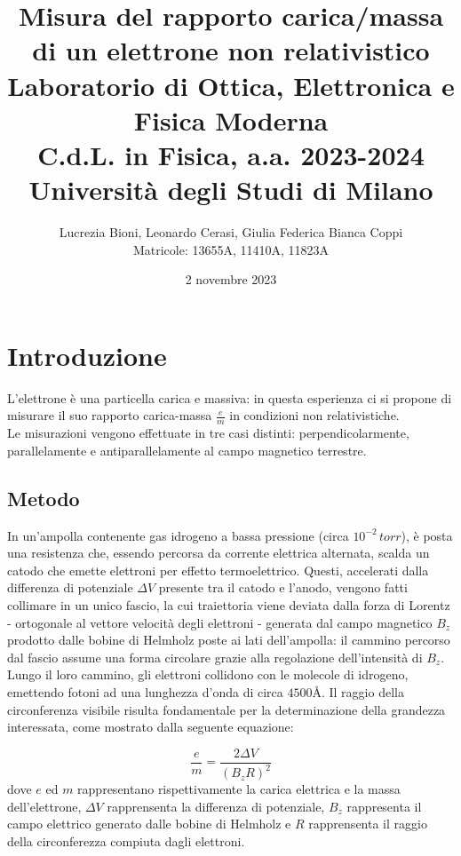 \documentclass[]{article}
\title{%
    \Huge Misura del rapporto carica/massa di un elettrone non relativistico \\
    \Large Laboratorio di Ottica, Elettronica e Fisica Moderna \\ C.d.L. in Fisica, a.a. 2023-2024 \\ Università degli Studi di Milano}
\author{\LARGE Lucrezia Bioni, Leonardo Cerasi, Giulia Federica Bianca Coppi \\ Matricole: 13655A, 11410A, 11823A}
\date{2 novembre 2023}
\let\oldsection\section%
\renewcommand{\section}{%
	\renewcommand{\theequation}{\thesection.\arabic{equation}}%
	\oldsection}%
\let\oldsubsection\subsection%
\renewcommand{\subsection}{%
	\renewcommand{\theequation}{\thesubsection.\arabic{equation}}%
	\oldsubsection}%
\begin{document}
    \maketitle

    \section{Introduzione}

    L'elettrone è una particella carica e massiva: in questa esperienza ci si propone di misurare il suo rapporto carica-massa $ \frac{e}{m} $ in condizioni non relativistiche. \\
    Le misurazioni vengono effettuate in tre casi distinti: perpendicolarmente, parallelamente e antiparallelamente al campo magnetico terrestre.


    \subsection{Metodo}
    In un'ampolla contenente gas idrogeno a bassa pressione (circa $ 10^{-2}\, torr $), è posta una resistenza che, essendo percorsa da corrente elettrica alternata, scalda un catodo che emette elettroni per effetto termoelettrico. Questi, accelerati dalla differenza di potenziale $\Delta V$ presente tra il catodo e l'anodo, vengono fatti collimare in un unico fascio, la cui traiettoria viene deviata dalla forza di Lorentz - ortogonale al vettore velocità degli elettroni - generata dal campo magnetico $ B_z $ prodotto dalle bobine di Helmholz poste ai lati dell'ampolla: il cammino percorso dal fascio assume una forma circolare grazie alla regolazione dell'intensità di $B_z$. \\

    Lungo il loro cammino, gli elettroni collidono con le molecole di idrogeno, emettendo fotoni ad una lunghezza d'onda di circa $4500 \text{Å}$.
    Il raggio della circonferenza visibile risulta fondamentale per la determinazione della grandezza interessata, come mostrato dalla seguente equazione:

    \begin{equation}
        \label{e_m}
        \frac{e}{m} = \frac{2 \Delta V}{(B_z R)^2}
    \end{equation}
    dove $ e $ ed $ m $ rappresentano rispettivamente la carica elettrica e la massa dell'elettrone, $\Delta V$ rapprensenta la differenza di potenziale, $B_z$ rappresenta il campo elettrico generato dalle bobine di Helmholz e $ R $ rapprensenta il raggio della circonferezza compiuta dagli elettroni. \\
\end{document}
